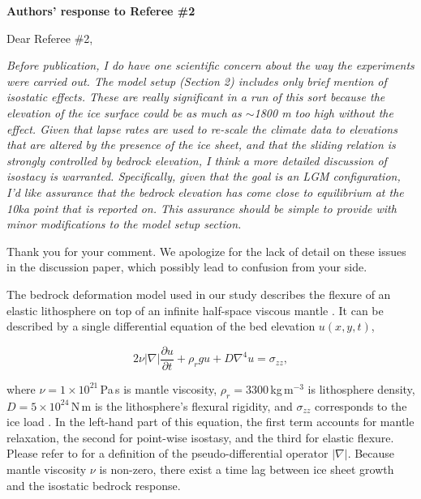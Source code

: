 \documentclass[10pt]{article}
\begin{document}
\textbf{Authors' response to Referee {\#}2}
\bigskip

\def\referee#1{\bigskip\textcolor{journalname}{\textit{#1}}}

Dear Referee {\#}2,

\referee{Before publication, I do have one scientific concern about the way the experiments were carried out. The model setup (Section 2) includes only brief mention of isostatic effects. These are really significant in a run of this sort because the elevation of the ice surface could be as much as $\sim$1800 m too high without the effect. Given that lapse rates are used to re-scale the climate data to elevations that are altered by the presence of the ice sheet, and that the sliding relation is strongly controlled by bedrock elevation, I think a more detailed discussion of isostacy is warranted. Specifically, given that the goal is an LGM configuration, I'd like assurance that the bedrock elevation has come close to equilibrium at the 10ka point that is reported on. This assurance should be simple to provide with minor modifications to the model setup section.}

Thank you for your comment. We apologize for the lack of detail on these issues in the discussion paper, which possibly lead to confusion from your side.

The bedrock deformation model used in our study describes the flexure of an elastic lithosphere on top of an infinite half-space viscous mantle \citep{lingle-clark-1985}. It can be described by a single differential equation of the bed elevation $u(x, y, t)$,

\begin{equation}
    2 \nu |\nabla| \frac{\partial u}{\partial t}
    + \rho_r g u
    + D \nabla^4 u
    = \sigma_{zz},
\end{equation}

where $\nu=1\times10^{21}$\,Pa\,s is mantle viscosity, $\rho_r = 3300$\,kg\,m$^{-3}$ is lithosphere density, $D=5\times10^{24}$\,N\,m is the lithosphere's flexural rigidity, and $\sigma_{zz}$ corresponds to the ice load \citet{bueler-etal-2007}. In the left-hand part of this equation, the first term accounts for mantle relaxation, the second for point-wise isostasy, and the third for elastic flexure. Please refer to \citet{bueler-etal-2007} for a definition of the pseudo-differential operator $|\nabla|$. Because mantle viscosity $\nu$ is non-zero, there exist a time lag between ice sheet growth and the isostatic bedrock response.
\end{document}
